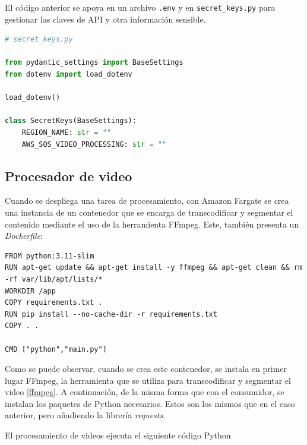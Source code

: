 El código anterior se apoya en un archivo \texttt{.env} y en \texttt{secret\_keys.py} para gestionar las claves de API y otra información sensible.

\begin{lstlisting}[language=Python]
# secret_keys.py

from pydantic_settings import BaseSettings
from dotenv import load_dotenv

load_dotenv()

class SecretKeys(BaseSettings):
    REGION_NAME: str = ""
    AWS_SQS_VIDEO_PROCESSING: str = ""
\end{lstlisting}




\subsection{Procesador de video}

Cuando se despliega una tarea de procesamiento, con Amazon Fargate se crea una instancia de un contenedor que se encarga de transcodificar y segmentar el contenido mediante el uso de la herramienta FFmpeg. Este, también presenta un \textit{Dockerfile}:

\begin{lstlisting}[language=docker]
FROM python:3.11-slim
RUN apt-get update && apt-get install -y ffmpeg && apt-get clean && rm -rf var/lib/apt/lists/*
WORKDIR /app
COPY requirements.txt .
RUN pip install --no-cache-dir -r requirements.txt
COPY . .

CMD ["python","main.py"]

\end{lstlisting}

Como se puede observar, cuando se crea este contenedor, se instala en primer lugar FFmpeg, la herramienta que se utiliza para transcodificar y segmentar el video \ref{ffmpeg}.
A continuación, de la misma forma que con el consumidor, se instalan los paquetes de Python necesarios. Estos son los mismos que en el caso anterior, pero añadiendo la librería \textit{requests}.

El procesamiento de videos ejecuta el siguiente código Python

